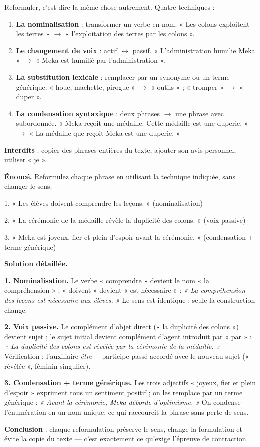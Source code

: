 \documentclass[11pt]{article}
\newcommand{\cle}[1]{{\popxbold\color{popdark}#1}}
\begin{document}
\begin{methode}
Reformuler, c'est dire la même chose autrement. Quatre techniques :
\begin{enumerate}
\item \textbf{La \cle{nominalisation}} : transformer un verbe en nom. « Les colons exploitent les terres » $\rightarrow$ « l'exploitation des terres par les colons ».
\item \textbf{Le \cle{changement de voix}} : actif $\leftrightarrow$ passif. « L'administration humilie Meka » $\rightarrow$ « Meka est humilié par l'administration ».
\item \textbf{La \cle{substitution lexicale}} : remplacer par un synonyme ou un terme générique. « houe, machette, pirogue » $\rightarrow$ « outils » ; « tromper » $\rightarrow$ « duper ».
\item \textbf{La \cle{condensation syntaxique}} : deux phrases $\rightarrow$ une phrase avec subordonnée. « Meka reçoit une médaille. Cette médaille est une duperie. » $\rightarrow$ « La médaille que reçoit Meka est une duperie. »
\end{enumerate}
\textbf{Interdits} : copier des phrases entières du texte, ajouter son avis personnel, utiliser « je ».
\end{methode}

\begin{exoresolu}
\textbf{Énoncé.} Reformulez chaque phrase en utilisant la technique indiquée, sans changer le sens.

1. « Les élèves doivent comprendre les leçons. » (nominalisation)

2. « La cérémonie de la médaille révèle la duplicité des colons. » (voix passive)

3. « Meka est joyeux, fier et plein d'espoir avant la cérémonie. » (condensation + terme générique)

\tcblower
\textbf{Solution détaillée.}

\textbf{1. Nominalisation.} Le verbe « comprendre » devient le nom « la compréhension » ; « doivent » devient « est nécessaire » :
\emph{« La compréhension des leçons est nécessaire aux élèves. »}
Le sens est identique ; seule la construction change.

\textbf{2. Voix passive.} Le complément d'objet direct (« la duplicité des colons ») devient sujet ; le sujet initial devient complément d'agent introduit par « par » :
\emph{« La duplicité des colons est révélée par la cérémonie de la médaille. »}
Vérification : l'auxiliaire \emph{être} + participe passé accordé avec le nouveau sujet (« révélée », féminin singulier).

\textbf{3. Condensation + terme générique.} Les trois adjectifs « joyeux, fier et plein d'espoir » expriment tous un sentiment positif ; on les remplace par un terme générique :
\emph{« Avant la cérémonie, Meka déborde d'optimisme. »}
On condense l'énumération en un nom unique, ce qui raccourcit la phrase sans perte de sens.

\textbf{Conclusion} : chaque reformulation préserve le sens, change la formulation et évite la copie du texte — c'est exactement ce qu'exige l'épreuve de contraction.
\end{exoresolu}
\end{document}

